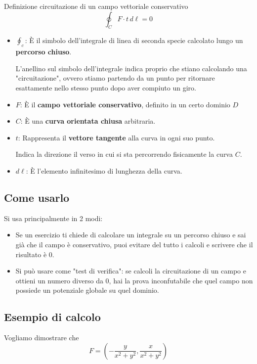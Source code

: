 \begin{definizione}{Definizione circuitazione di un campo vettoriale conservativo}
{\Large
    $$
    \oint_{C} F \cdot t \, d \ell = 0
    $$
}
    \begin{itemize}
        \item $\oint_{c}$: È il simbolo dell'integrale di linea di seconda specie calcolato lungo un \textbf{percorso chiuso}.

        L'anellino sul simbolo dell'integrale indica proprio che stiano calcolando una "circuitazione", ovvero stiamo partendo da un punto per ritornare esattamente nello stesso punto dopo aver compiuto un giro.

        \item $F$: È il \textbf{campo vettoriale conservativo}, definito in un certo dominio $D$
        \item $C$: È una \textbf{curva orientata chiusa} arbitraria.
        \item $t$: Rappresenta il \textbf{vettore tangente} alla curva in ogni suo punto.

        Indica la direzione il verso in cui si sta percorrendo fisicamente la curva $C$.
        \item $d\ell$: È l'elemento infinitesimo di lunghezza della curva.
    \end{itemize}
\end{definizione}

\subsection{Come usarlo}
Si usa principalmente in 2 modi:
\begin{itemize}
    \item Se un esercizio ti chiede di calcolare un integrale su un percorso chiuso e sai già che il campo è conservativo, puoi evitare del tutto i calcoli e scrivere che il risultato è 0.
    \item Si può usare come "test di verifica": se calcoli la circuitazione di un campo e ottieni un numero diverso da 0, hai la prova inconfutabile che quel campo non possiede un potenziale globale su quel dominio.
\end{itemize}

\newpage

\subsection{Esempio di calcolo}
Vogliamo dimostrare che 
{\large
$$
    F = (-\frac{y}{x^2+y^2} , \frac{x}{x^2 + y^2})
$$
}

